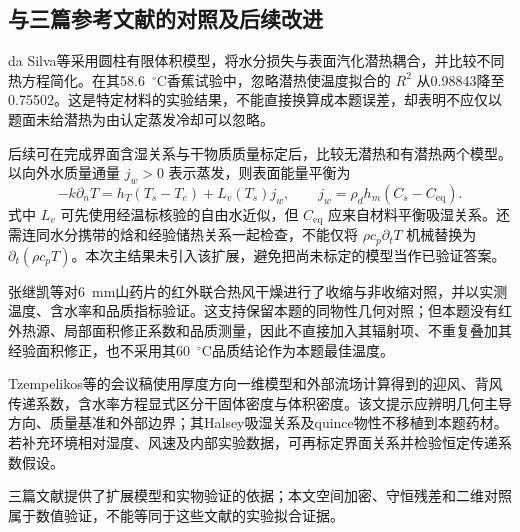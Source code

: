 \subsection{与三篇参考文献的对照及后续改进}
da Silva等\cite{silva2014}采用圆柱有限体积模型，将水分损失与表面汽化潜热耦合，并比较不同热方程简化。在其58.6~$^\circ$C香蕉试验中，忽略潜热使温度拟合的 $R^2$ 从0.98843降至0.75502。这是特定材料的实验结果，不能直接换算成本题误差，却表明不应仅以题面未给潜热为由认定蒸发冷却可以忽略。

后续可在完成界面含湿关系与干物质质量标定后，比较无潜热和有潜热两个模型。以向外水质量通量 $j_w>0$ 表示蒸发，则表面能量平衡为
\begin{equation}
-k\partial_nT=h_T(T_s-T_e)+L_v(T_s)j_w,\qquad
j_w=\rho_d h_m(C_s-C_{\mathrm{eq}}).\label{eq:latent_extension}
\end{equation}
式中 $L_v$ 可先使用经温标核验的自由水近似，但 $C_{\mathrm{eq}}$ 应来自材料平衡吸湿关系。还需连同水分携带的焓和经验储热关系一起检查，不能仅将 $\rho c_p\partial_tT$ 机械替换为 $\partial_t(\rho c_pT)$。本次主结果未引入该扩展，避免把尚未标定的模型当作已验证答案。

张继凯等\cite{zhang2024}对6~mm山药片的红外联合热风干燥进行了收缩与非收缩对照，并以实测温度、含水率和品质指标验证。这支持保留本题的同物性几何对照；但本题没有红外热源、局部面积修正系数和品质测量，因此不直接加入其辐射项、不重复叠加其经验面积修正，也不采用其60~$^\circ$C品质结论作为本题最佳温度。

Tzempelikos等的会议稿\cite{quince2014}使用厚度方向一维模型和外部流场计算得到的迎风、背风传递系数，含水率方程显式区分干固体密度与体积密度。该文提示应辨明几何主导方向、质量基准和外部边界；其Halsey吸湿关系及quince物性不移植到本题药材。若补充环境相对湿度、风速及内部实验数据，可再标定界面关系并检验恒定传递系数假设。

三篇文献提供了扩展模型和实物验证的依据；本文空间加密、守恒残差和二维对照属于数值验证，不能等同于这些文献的实验拟合证据。
